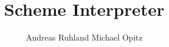 \documentclass{sig-alternate}
\begin{document}
\title{Scheme Interpreter}


\author{
\alignauthor
Andreas Ruhland
\alignauthor
Michael Opitz
}

\maketitle
\end{document}
